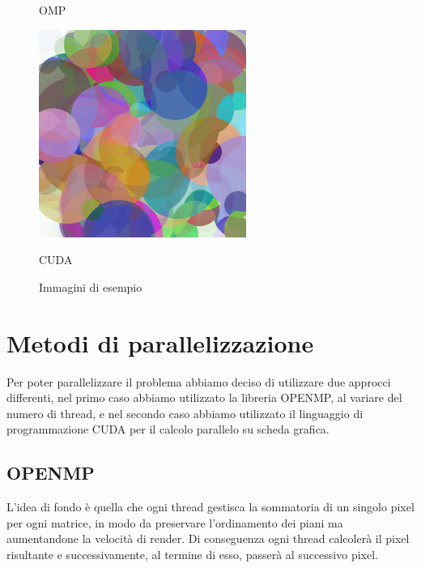 \documentclass[11pt]{article}
\begin{document}
\begin{figure}[h!]
\begin{minipage}{0.32\textwidth}
            \caption{OMP}
        \end{minipage}%
        \hfill
        \begin{minipage}{0.32\textwidth}
            \centering
            \includegraphics[width=\textwidth]{img/cuda/10000}
            \caption{CUDA}
        \end{minipage}
        \caption{Immagini di esempio}\label{fig:example-images}
    \end{figure}

    \section{Metodi di parallelizzazione}\label{sec:metodi-di-parallelizazzione}
    Per poter parallelizzare il problema abbiamo deciso di utilizzare due approcci differenti, nel primo caso abbiamo
    utilizzato la libreria OPENMP, al variare del numero di thread, e nel secondo caso abbiamo utilizzato il linguaggio
    di programmazione CUDA per il calcolo parallelo su scheda grafica\@.
    

    \subsection{OPENMP}\label{subsec:openmp}
    L'idea di fondo è quella che ogni thread gestisca la sommatoria di un singolo pixel per ogni matrice, in
    modo da preservare l'ordinamento dei piani ma aumentandone la velocità di render.
    Di conseguenza ogni thread calcolerà il pixel risultante e successivamente, al termine di esso, passerà
    al successivo pixel.
    
\end{document}
